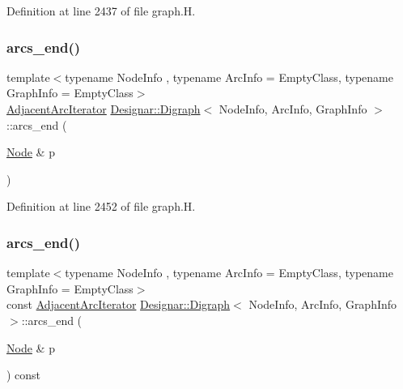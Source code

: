 Definition at line 2437 of file graph.\+H.

\mbox{\label{class_designar_1_1_digraph_ab7e47c93dd15bab0510977f403a35849}} 
\subsubsection{\texorpdfstring{arcs\+\_\+end()}{arcs\_end()}\hspace{0.1cm}{\footnotesize\ttfamily [3/4]}}
{\footnotesize\ttfamily template$<$typename Node\+Info , typename Arc\+Info  = Empty\+Class, typename Graph\+Info  = Empty\+Class$>$ \\
\hyperlink{class_designar_1_1_digraph_1_1_adjacent_arc_iterator}{Adjacent\+Arc\+Iterator} \hyperlink{class_designar_1_1_digraph}{Designar\+::\+Digraph}$<$ Node\+Info, Arc\+Info, Graph\+Info $>$\+::arcs\+\_\+end (\begin{DoxyParamCaption}\item[{\hyperlink{class_designar_1_1_digraph_a4dc921c41a480b7946a04170e997d8ae}{Node} \&}]{p }\end{DoxyParamCaption})\hspace{0.3cm}{\ttfamily [inline]}}



Definition at line 2452 of file graph.\+H.

\mbox{\label{class_designar_1_1_digraph_a68abe34d6f5a7b429715ec55aa030b7d}} 
\subsubsection{\texorpdfstring{arcs\+\_\+end()}{arcs\_end()}\hspace{0.1cm}{\footnotesize\ttfamily [4/4]}}
{\footnotesize\ttfamily template$<$typename Node\+Info , typename Arc\+Info  = Empty\+Class, typename Graph\+Info  = Empty\+Class$>$ \\
const \hyperlink{class_designar_1_1_digraph_1_1_adjacent_arc_iterator}{Adjacent\+Arc\+Iterator} \hyperlink{class_designar_1_1_digraph}{Designar\+::\+Digraph}$<$ Node\+Info, Arc\+Info, Graph\+Info $>$\+::arcs\+\_\+end (\begin{DoxyParamCaption}\item[{\hyperlink{class_designar_1_1_digraph_a4dc921c41a480b7946a04170e997d8ae}{Node} \&}]{p }\end{DoxyParamCaption}) const\hspace{0.3cm}{\ttfamily [inline]}}




